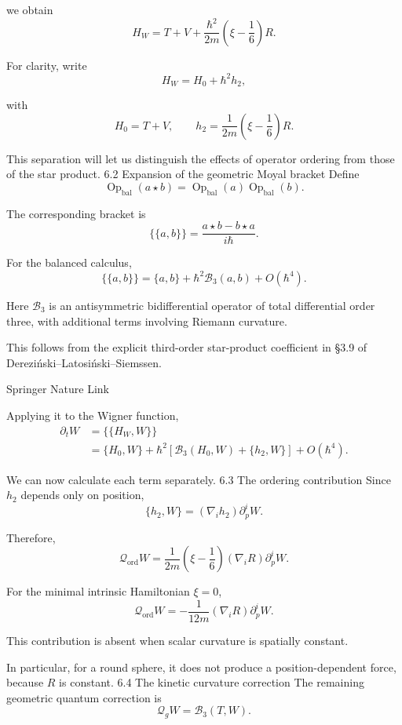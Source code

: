 we obtain
\[
\boxed{
H_W=T+V+
\frac{\hbar^2}{2m}
\left(\xi-\frac16\right)R.
}
\tag{42}
\]

For clarity, write
\[
H_W=H_0+\hbar^2h_2,
\]

with
\[
H_0=T+V,\qquad
h_2=\frac1{2m}\left(\xi-\frac16\right)R.
\tag{43}
\]

This separation will let us distinguish the effects of operator ordering from those of the star product.
6.2 Expansion of the geometric Moyal bracket
Define
\[
\operatorname{Op}_{\mathrm{bal}}(a\star b)
=
\operatorname{Op}_{\mathrm{bal}}(a)
\operatorname{Op}_{\mathrm{bal}}(b).
\tag{44}
\]

The corresponding bracket is
\[
\{\!\{a,b\}\!\}
=
\frac{a\star b-b\star a}{i\hbar}.
\tag{45}
\]

For the balanced calculus,
\[
\boxed{
\{\!\{a,b\}\!\}
=
\{a,b\}+\hbar^2\mathcal B_3(a,b)
+O(\hbar^4).
}
\tag{46}
\]

Here \(\mathcal B_3\) is an antisymmetric bidifferential operator of total differential order three, with additional terms involving Riemann curvature.

This follows from the explicit third-order star-product coefficient in §3.9 of Dereziński–Latosiński–Siemssen. 

Springer Nature Link




Applying it to the Wigner function,
\[
\begin{aligned}
\partial_tW
&=\{\!\{H_W,W\}\!\}\\
&=\{H_0,W\}
+\hbar^2
\left[
\mathcal B_3(H_0,W)
+\{h_2,W\}
\right]
+O(\hbar^4).
\end{aligned}
\tag{47}
\]

We can now calculate each term separately.
6.3 The ordering contribution
Since \(h_2\) depends only on position,
\[
\{h_2,W\}
=
(\nabla_i h_2)\partial_p^iW.
\]

Therefore,
\[
\boxed{
\mathcal Q_{\mathrm{ord}}W
=
\frac1{2m}
\left(\xi-\frac16\right)
(\nabla_iR)\partial_p^iW.
}
\tag{48}
\]

For the minimal intrinsic Hamiltonian \(\xi=0\),
\[
\boxed{
\mathcal Q_{\mathrm{ord}}W
=
-\frac1{12m}(\nabla_iR)\partial_p^iW.
}
\tag{49}
\]

This contribution is absent when scalar curvature is spatially constant.

In particular, for a round sphere, it does not produce a position-dependent force, because \(R\) is constant.
6.4 The kinetic curvature correction
The remaining geometric quantum correction is
\[
\mathcal Q_gW=\mathcal B_3(T,W).
\tag{50}
\]

